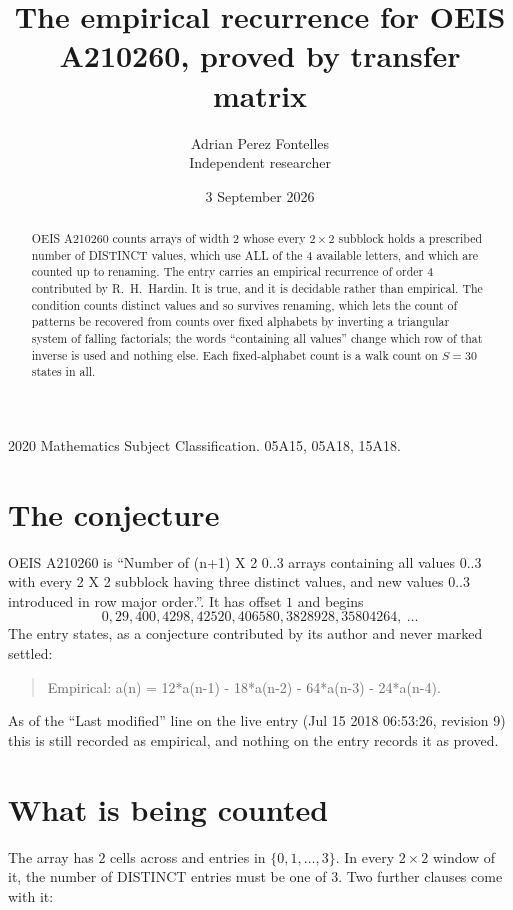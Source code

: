 \documentclass[11pt,a4paper]{article}
\title{The empirical recurrence for OEIS A210260, proved by transfer matrix}
\author{Adrian Perez Fontelles\\ \small Independent researcher}
\date{3 September 2026}
\theoremstyle{plain}
\theoremstyle{definition}
\begin{document}
\maketitle

\begin{abstract}
OEIS A210260 counts arrays of width $2$ whose every $2\times2$ subblock holds a
prescribed number of DISTINCT values, which use ALL of the $4$ available letters, and which
are counted up to renaming. The entry carries an empirical recurrence of order $4$
contributed by R.~H.~Hardin. It is true, and it is decidable rather than empirical. The
condition counts distinct values and so survives renaming, which lets the count of patterns be
recovered from counts over fixed alphabets by inverting a triangular system of falling
factorials; the words ``containing all values'' change which row of that inverse is used and
nothing else. Each fixed-alphabet count is a walk count on $S=30$ states in all.
\end{abstract}

\noindent\small 2020 Mathematics Subject Classification. 05A15, 05A18, 15A18.\normalsize

\section{The conjecture}

OEIS A210260 is ``Number of (n+1) X 2 0..3 arrays containing all values 0..3 with every 2 X 2 subblock having three distinct values, and new values 0..3 introduced in row major order.''. It has offset $1$ and begins
\[
0, 29, 400, 4298, 42520, 406580, 3828928, 35804264,\ \dots
\]
The entry states, as a conjecture contributed by its author and never marked settled:
\begin{quote}
Empirical: a(n) = 12*a(n-1) - 18*a(n-2) - 64*a(n-3) - 24*a(n-4).
\end{quote}
As of the ``Last modified'' line on the live entry (Jul 15 2018 06:53:26, revision 9) this is still
recorded as empirical, and nothing on the entry records it as proved.

\section{What is being counted}

The array has $2$ cells across and entries in $\{0,1,\dots,3\}$. In every
$2\times2$ window of it, the number of DISTINCT entries must be one of $3$. Two
further clauses come with it:
\end{document}

